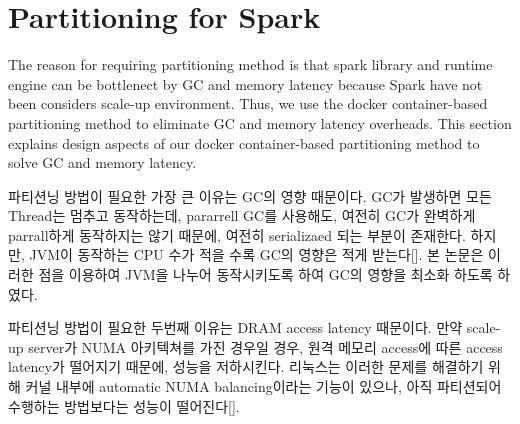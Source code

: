 \section{Partitioning for Spark}
\ifkor
The reason for requiring partitioning method is that
spark library and runtime engine can be bottlenect by GC and memory latency
because Spark have not been considers scale-up environment.
Thus, we use the docker container-based partitioning method to eliminate GC and
memory latency overheads. 
This section explains design aspects of our docker container-based partitioning
method to solve GC and memory latency.
\else

\fi


\ifkor
파티션닝 방법이 필요한 가장 큰 이유는 GC의 영향 때문이다. 
GC가 발생하면 모든 Thread는 멈추고 동작하는데, pararrell GC를 사용해도, 여전히 
GC가 완벽하게 parrall하게 동작하지는 않기 때문에, 여전히 serializaed 되는 부분이 존재한다.
하지만, JVM이 동작하는 CPU 수가 적을 수록 GC의 영향은 적게 받는다[]. 
본 논문은 이러한 점을 이용하여 JVM을 나누어 동작시키도록 하여 GC의 영향을 최소화 하도록
하였다. 
\else

\fi

\ifkor
파티션닝 방법이 필요한 두번째 이유는 DRAM access latency 때문이다. 
만약 scale-up server가 NUMA 아키텍쳐를 가진 경우일 경우, 
원격 메모리 access에 따른 access latency가 떨어지기 때문에, 성능을 저하시킨다.
리눅스는 이러한 문제를 해결하기 위해 커널 내부에 automatic NUMA balancing이라는 기능이 있으나, 
아직 파티션되어 수행하는 방법보다는 성능이 떨어진다[]. 
\else

